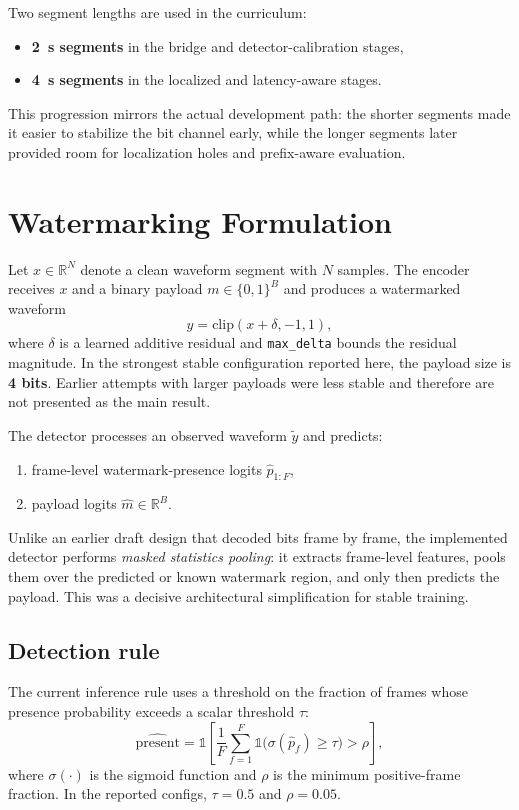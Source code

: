 Two segment lengths are used in the curriculum:
\begin{itemize}[leftmargin=1.25em]
  \item \textbf{2~s segments} in the bridge and detector-calibration stages,
  \item \textbf{4~s segments} in the localized and latency-aware stages.
\end{itemize}
This progression mirrors the actual development path: the shorter segments made it easier to stabilize the bit channel early, while the longer segments later provided room for localization holes and prefix-aware evaluation.

\section{Watermarking Formulation}
Let $x \in \mathbb{R}^{N}$ denote a clean waveform segment with $N$ samples. The encoder receives $x$ and a binary payload $m \in \{0,1\}^{B}$ and produces a watermarked waveform
\begin{equation}
  y = \mathrm{clip}(x + \delta, -1, 1),
\end{equation}
where $\delta$ is a learned additive residual and \texttt{max\_delta} bounds the residual magnitude. In the strongest stable configuration reported here, the payload size is \textbf{4 bits}. Earlier attempts with larger payloads were less stable and therefore are not presented as the main result.

The detector processes an observed waveform $\tilde{y}$ and predicts:
\begin{enumerate}[leftmargin=1.25em]
  \item frame-level watermark-presence logits $\hat{p}_{1:F}$,
  \item payload logits $\hat{m} \in \mathbb{R}^{B}$.
\end{enumerate}
Unlike an earlier draft design that decoded bits frame by frame, the implemented detector performs \emph{masked statistics pooling}: it extracts frame-level features, pools them over the predicted or known watermark region, and only then predicts the payload. This was a decisive architectural simplification for stable training.

\subsection{Detection rule}
The current inference rule uses a threshold on the fraction of frames whose presence probability exceeds a scalar threshold $\tau$:
\begin{equation}
  \widehat{\mathrm{present}} = \mathbb{1}\!\left[\frac{1}{F}\sum_{f=1}^{F}\mathbb{1}\big(\sigma(\hat{p}_f) \ge \tau\big) > \rho\right],
\end{equation}
where $\sigma(\cdot)$ is the sigmoid function and $\rho$ is the minimum positive-frame fraction. In the reported configs, $\tau = 0.5$ and $\rho = 0.05$.

